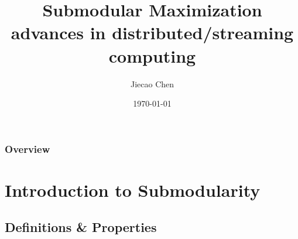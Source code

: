 \documentclass{beamer}
\title[Submodular Maximization]{Submodular Maximization\\\small{advances in distributed/streaming computing}} %
\author{Jiecao Chen} %
\institute[IUB] %
{
Indiana University Bloomington \\ %
\medskip
\textit{jiecchen@indiana} %
}
\date{\today} %
\begin{document}
\begin{frame}
\titlepage %
\end{frame}

\begin{frame}
\frametitle{Overview} %
\tableofcontents %
\end{frame}


\section{Introduction to Submodularity} %

\subsection{Definitions \& Properties} %
\end{document}

